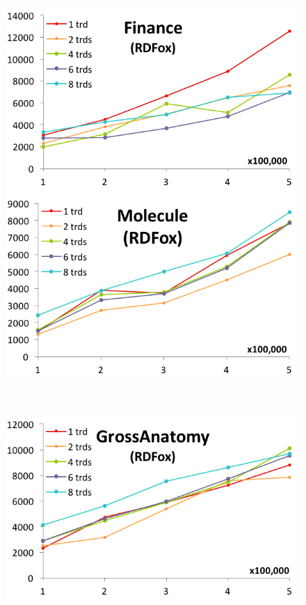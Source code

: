 \begin{figure}[htbp]
  \centering
  \begin{minipage}{.5\textwidth}
    \includegraphics[width=\textwidth]{experimentalResults/1-Finance-rdfox}
  \end{minipage}
  \begin{minipage}{.5\textwidth}
    \includegraphics[width=\textwidth]{experimentalResults/2-molecule-rdfox}
  \end{minipage}\\
  \begin{minipage}{.5\textwidth}
    \includegraphics[width=\textwidth]{experimentalResults/3-NIF_GrossAnatomy-rdfox}

\end{minipage}
\end{figure}
